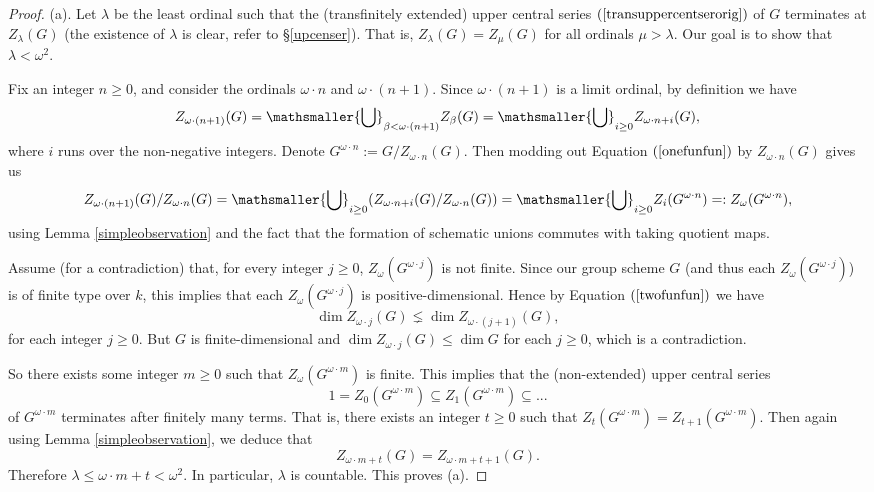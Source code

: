 \documentclass[twoside,a4paper,reqno,11pt]{amsart}
\theoremstyle{definition}
\begin{document}
\begin{proof} (a). Let $\lambda$ be the least ordinal such that the (transfinitely extended) upper central series $(\ref{transuppercentserorig})$ of $G$ terminates at $Z_\lambda(G)$ (the existence of $\lambda$ is clear, refer to \S\ref{upcenser}). That is, $Z_\lambda(G)=Z_\mu(G)$ for all ordinals $\mu >\lambda$. Our goal is to show that $\lambda < \omega^2$. %

\vspace{2mm}\noindent Fix an integer $n\geq 0$, and consider the ordinals $\omega\cdot n$ and $\omega\cdot (n+1)$. Since $\omega\cdot (n+1)$ is a limit ordinal, by definition we have \begin{equation}\label{onefunfun} Z_{\omega\cdot(n+1)}(G)=\mathsmaller{\bigcup}_{\beta < \omega\cdot(n+1)}Z_\beta(G)=\mathsmaller{\bigcup}_{i\geq 0}Z_{\omega\cdot n+i}(G),\end{equation} where $i$ runs over the non-negative integers. Denote $G^{\omega\cdot n}:=G/Z_{\omega\cdot n}(G)$. Then modding out Equation $(\ref{onefunfun})$ by $Z_{\omega\cdot n}(G)$ gives us \begin{equation}\label{twofunfun} Z_{\omega\cdot(n+1)}(G)/Z_{\omega\cdot n}(G)=\mathsmaller{\bigcup}_{i\geq 0}(Z_{\omega\cdot n+i}(G)/Z_{\omega\cdot n}(G))=\mathsmaller{\bigcup}_{i\geq 0}Z_i(G^{\omega\cdot n})=:Z_\omega(G^{\omega\cdot n}), \end{equation} using Lemma \ref{simpleobservation} and the fact that the formation of schematic unions commutes with taking quotient maps.

\vspace{2mm}\noindent Assume (for a contradiction) that, for every integer $j\geq 0$, $Z_\omega(G^{\omega\cdot j})$ is not finite. Since our group scheme $G$ (and thus each $Z_\omega(G^{\omega\cdot j})$) is of finite type over $k$, this implies that each $Z_\omega(G^{\omega\cdot j})$ is positive-dimensional. Hence by Equation $(\ref{twofunfun})$ we have $$\dim Z_{\omega\cdot j}(G)\lneq \dim Z_{\omega\cdot(j+1)}(G),$$ for each integer $j\geq 0$. But $G$ is finite-dimensional and $\dim Z_{\omega\cdot j}(G)\leq \dim G$ for each $j\geq 0$, which is a contradiction.

\vspace{2mm}\noindent So there exists some integer $m\geq 0$ such that $Z_\omega(G^{\omega\cdot m})$ is finite. This implies that the (non-extended) upper central series \begin{equation}\label{rawh} 1=Z_0(G^{\omega\cdot m})\subseteq Z_1(G^{\omega\cdot m})\subseteq ...\end{equation} of $G^{\omega\cdot m}$ terminates after finitely many terms. That is, there exists an integer $t\geq 0$ such that $Z_t(G^{\omega\cdot m})=Z_{t+1}(G^{\omega\cdot m})$. Then again using Lemma \ref{simpleobservation}, we deduce that \begin{equation}\label{finalconc} Z_{\omega\cdot m+t}(G)=Z_{\omega\cdot m+t+1}(G).\end{equation} Therefore $\lambda\leq \omega\cdot m+t<\omega^2$. In particular, $\lambda$ is countable. This proves (a).


\end{proof}
\end{document}
